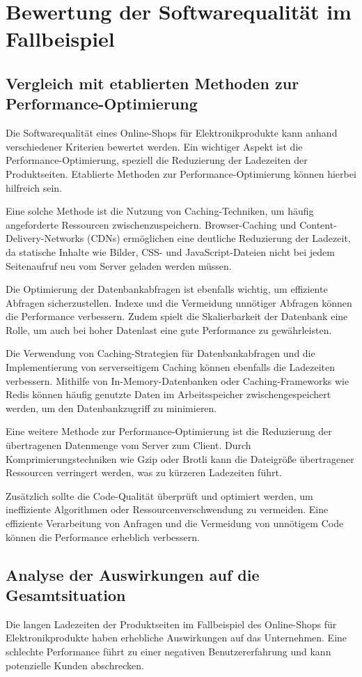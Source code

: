 \section{Bewertung der Softwarequalität im Fallbeispiel}
\subsection{Vergleich mit etablierten Methoden zur Performance-Optimierung}
Die Softwarequalität eines Online-Shops für Elektronikprodukte kann anhand verschiedener Kriterien bewertet werden. Ein wichtiger Aspekt ist die Performance-Optimierung, speziell die Reduzierung der Ladezeiten der Produktseiten. Etablierte Methoden zur Performance-Optimierung können hierbei hilfreich sein.

Eine solche Methode ist die Nutzung von Caching-Techniken, um häufig angeforderte Ressourcen zwischenzuspeichern. Browser-Caching und Content-Delivery-Networks (CDNs) ermöglichen eine deutliche Reduzierung der Ladezeit, da statische Inhalte wie Bilder, CSS- und JavaScript-Dateien nicht bei jedem Seitenaufruf neu vom Server geladen werden müssen.

Die Optimierung der Datenbankabfragen ist ebenfalls wichtig, um effiziente Abfragen sicherzustellen. Indexe und die Vermeidung unnötiger Abfragen können die Performance verbessern. Zudem spielt die Skalierbarkeit der Datenbank eine Rolle, um auch bei hoher Datenlast eine gute Performance zu gewährleisten.

Die Verwendung von Caching-Strategien für Datenbankabfragen und die Implementierung von serverseitigem Caching können ebenfalls die Ladezeiten verbessern. Mithilfe von In-Memory-Datenbanken oder Caching-Frameworks wie Redis können häufig genutzte Daten im Arbeitsspeicher zwischengespeichert werden, um den Datenbankzugriff zu minimieren.

Eine weitere Methode zur Performance-Optimierung ist die Reduzierung der übertragenen Datenmenge vom Server zum Client. Durch Komprimierungstechniken wie Gzip oder Brotli kann die Dateigröße übertragener Ressourcen verringert werden, was zu kürzeren Ladezeiten führt.

Zusätzlich sollte die Code-Qualität überprüft und optimiert werden, um ineffiziente Algorithmen oder Ressourcenverschwendung zu vermeiden. Eine effiziente Verarbeitung von Anfragen und die Vermeidung von unnötigem Code können die Performance erheblich verbessern.

\subsection{Analyse der Auswirkungen auf die Gesamtsituation}
Die langen Ladezeiten der Produktseiten im Fallbeispiel des Online-Shops für Elektronikprodukte haben erhebliche Auswirkungen auf das Unternehmen. Eine schlechte Performance führt zu einer negativen Benutzererfahrung und kann potenzielle Kunden abschrecken.

